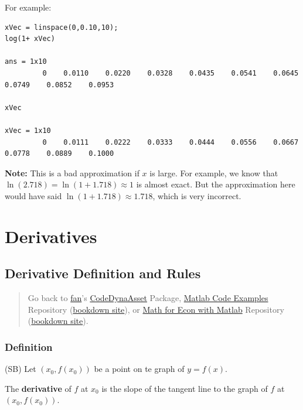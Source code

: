 \documentclass[
]{book}
\begin{document}
For example:

\begin{verbatim}
xVec = linspace(0,0.10,10);
log(1+ xVec)

ans = 1x10    
         0    0.0110    0.0220    0.0328    0.0435    0.0541    0.0645    0.0749    0.0852    0.0953

xVec

xVec = 1x10    
         0    0.0111    0.0222    0.0333    0.0444    0.0556    0.0667    0.0778    0.0889    0.1000
\end{verbatim}

\textbf{Note:} This is a bad approximation if \(x\) is large. For example, we
know that \(\ln (2.718)=\ln (1+1.718)\approx 1\) is almost exact. But the
approximation here would have said \(\ln (1+1.718)\approx 1.718\), which
is very incorrect.

\hypertarget{derivatives}{%
\chapter{Derivatives}\label{derivatives}}

\hypertarget{derivative-definition-and-rules}{%
\section{Derivative Definition and Rules}\label{derivative-definition-and-rules}}

\begin{quote}
Go back to \href{http://fanwangecon.github.io/}{fan}'s \href{https://fanwangecon.github.io/CodeDynaAsset/}{CodeDynaAsset} Package, \href{https://fanwangecon.github.io/M4Econ/}{Matlab Code Examples} Repository (\href{https://fanwangecon.github.io/M4Econ/bookdown}{bookdown site}), or \href{https://fanwangecon.github.io/Math4Econ/}{Math for Econ with Matlab} Repository (\href{https://fanwangecon.github.io/Math4Econ/bookdown}{bookdown site}).
\end{quote}

\hypertarget{definition}{%
\subsection{Definition}\label{definition}}

(SB) Let \((x_0 ,f(x_0 ))\) be a point on te graph of \(y=f(x)\).

The \textbf{derivative} of \(f\) at \(x_0\) is the slope of the tangent line to
the graph of \(f\) at \((x_0 ,f(x_0 ))\).
\end{document}
